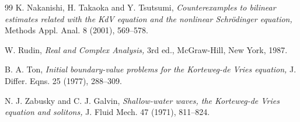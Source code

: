 \documentclass[10pt,reqno]{amsart}
\theoremstyle{remark}
\numberwithin{equation}{section}
\begin{document}
\begin{thebibliography}{99}
 K. Nakanishi, H. Takaoka and Y. Tsutsumi, {\it Counterexamples to bilinear estimates related with the KdV equation and the nonlinear Schr\"odinger equation,} Methods Appl. Anal. 8 (2001), 569--578.

 W. Rudin, {\it Real and Complex Analysis,} 3rd ed., McGraw-Hill, New York, 1987.

 B. A. Ton, {\it Initial boundary-value problems for the Korteweg-de Vries equation,} J. Differ. Eqns. 25 (1977), 288--309.

 N. J. Zabusky and C. J. Galvin, {\it Shallow-water waves, the Korteweg-de Vries equation and solitons,} J. Fluid Mech. 47 (1971), 811--824.

\end{thebibliography}
\end{document}
